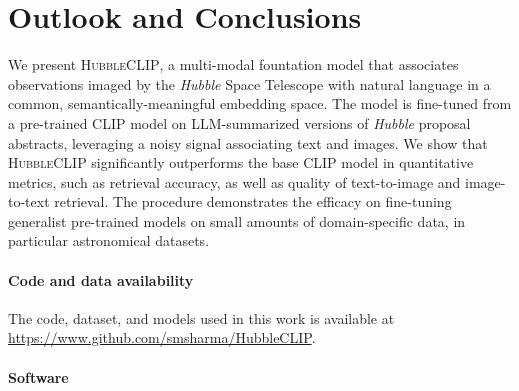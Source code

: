 \documentclass[10pt]{article} %
\newcommand{\hubble}{\emph{Hubble}\xspace}
\begin{document}
\section{Outlook and Conclusions}
\label{sec:conclusion}

We present \textsc{HubbleCLIP}, a multi-modal fountation model that associates observations imaged by the \hubble Space Telescope with natural language in a common, semantically-meaningful embedding space. The model is fine-tuned from a pre-trained CLIP model on LLM-summarized versions of \hubble proposal abstracts, leveraging a noisy signal associating text and images. We show that \textsc{HubbleCLIP} significantly outperforms the base CLIP model in quantitative metrics, such as retrieval accuracy, as well as quality of text-to-image and image-to-text retrieval. The procedure demonstrates the efficacy on fine-tuning generalist pre-trained models on small amounts of domain-specific data, in particular astronomical datasets.




\paragraph*{Code and data availability}

The code, dataset, and models used in this work is available at \url{https://www.github.com/smsharma/HubbleCLIP}.

\paragraph*{Software}
\end{document}
